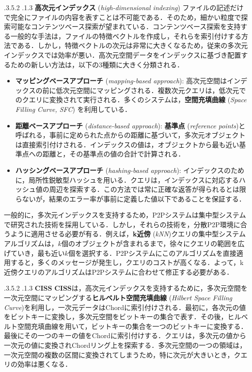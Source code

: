 \documentclass{jarticle}
\makeatletter
\renewcommand{\subsection}{\@startsection{subsection}{2}{\z@}%
   {.3\Cvs \@plus.5\Cvs \@minus.2\Cvs}%
   {.1\Cvs \@plus.3\Cvs}%
   {\reset@font\large\bfseries}}
\renewcommand{\subsubsection}{\@startsection{subsubsection}{3}{\z@}%
   {.3\Cvs \@plus.5\Cvs \@minus.2\Cvs}%
   {.1\Cvs \@plus.3\Cvs}%
   {\reset@font\normalsize\bfseries}}
\makeatother
\begin{document}
{\subsection{\textbf{高次元インデックス} (\textit{high-dimensional indexing})}
ファイルの記述だけで完全にファイルの内容を表すことは不可能である．そのため，細かい粒度で探索可能なコンテンツベース探索が望まれている．コンテンツベース探索を支持する一般的な手法は，ファイルの特徴ベクトルを作成し，それらを索引付けする方法である．しかし，特徴ベクトルの次元は非常に大きくなるため，従来の多次元インデックスでは効率が悪い．高次元空間データをインデックスに基づき配置するための新しい方法は，以下の3種類に大きく分類される．
\begin{itemize}
  \item\textbf{マッピングベースアプローチ} (\textit{mapping-based approach}): 高次元空間はインデックスの前に低次元空間にマッピングされる．複数次元クエリは，低次元でのクエリに変換されて実行される．多くのシステムは，\textbf{空間充填曲線} (\textit{Space Filling Curve, SFC}) を利用している．
  \item\textbf{距離ベースアプローチ} (\textit{distance-based approach}): \textbf{基準点} (\textit{reference points})と呼ばれる，事前に定められた点からの距離に基づいて，多次元オブジェクトは直接索引付けされる．インデックスの値は，オブジェクトから最も近い基準点への距離と，その基準点の値の合計で計算される． 
  \item\textbf{ハッシングベースアプローチ} (\textit{hashing-based approach}): インデックスのために，局所性鋭敏型ハッシュを用いる．クエリは，インデックスに対応するハッシュ値の周辺を探索する．この方法では常に正確な返答が得られるとは限らないが，結果のエラー率が事前に定義した値以下であることを保証する．
  \end{itemize}
 
一般的に，多次元インデックスを支持するため，P2Pシステムは集中型システムで研究された技術を採用している．しかし，それらの技術を，分散P2P環境に合うように適用させる必要が有る．例えば，\textbf{k近傍} (\textit{kNN})クエリの集中型システムアルゴリズムは，$k$個のオブジェクトが含まれるまで，徐々にクエリの範囲を広げていき，最も近い$k$個を選択する．P2Pシステムにこのアルゴリズムを直接適用すると，多くのメッセージが発生し，クエリのコストが高くなる．よって，k近傍クエリのアルゴリズムはP2Pシステムに合わせて修正する必要がある．

\subsubsection{\textbf{CISS}}
\textbf{CISS}は，高次元インデックスを支持するために，多次元空間を一次元空間にマッピングする\textbf{ヒルベルト空間充填曲線} (\textit{Hilbert Space Filling Curve})を利用し，一次元データはChordに索引付けされる．最初に，各次元の値をビットキーに変換し，多次元空間をビットキーの集合で表す．その後，ヒルベルト空間充填曲線を用いて，ビットキーの集合を一つのビットキーに変換する．最後にその一つのキーの値をChordに索引付けする．クエリは，多次元の値から一次元の値に変換されChordリング上を探索する．多次元空間の一つの領域は，一次元空間の複数の区間に変換されてしまうため，特に次元が大きいとき，クエリの効率は悪くなる．

}
\end{document}
